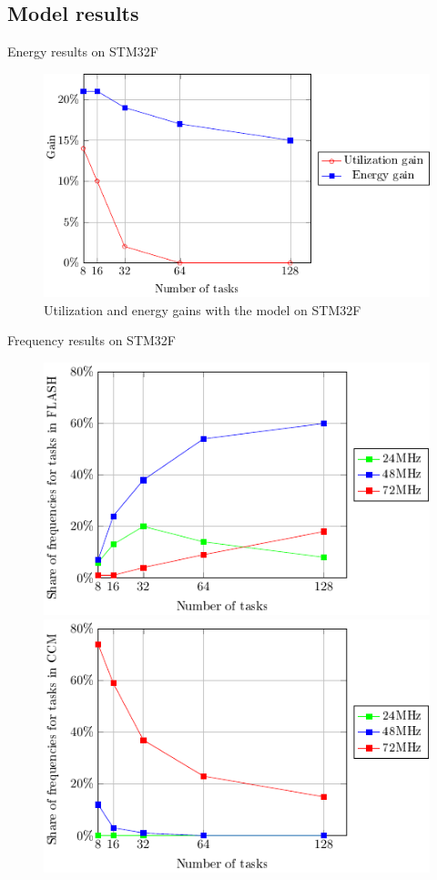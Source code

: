 \documentclass[
	11pt, %
]{beamer}
\begin{document}
\subsection{Model results
}
\begin{frame}{Energy results on STM32F}
	\begin{figure}
		\includegraphics{data/model/poster.pdf}
		\caption{Utilization and energy gains with the model on STM32F}
	\end{figure}
\end{frame}
\begin{frame}{Frequency results on STM32F}
	\begin{figure}
        \includegraphics[scale = 0.7]{data/model/frequency_choose.pdf}
		\includegraphics[scale = 0.7]{data/model/frequency_choose_CCM.pdf}
	\end{figure}
\end{frame}
\end{document}
